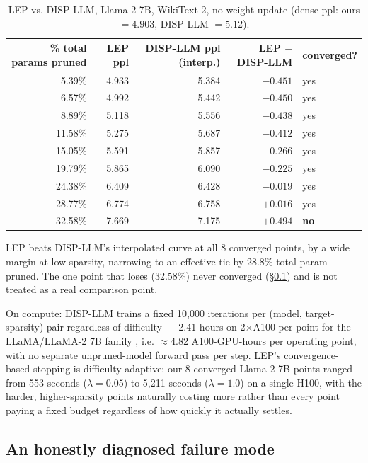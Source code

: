 \documentclass[11pt]{article}
\begin{document}
\begin{table}[htbp]
\centering
\caption{LEP vs. DISP-LLM, Llama-2-7B, WikiText-2, no weight update (dense ppl: ours $=4.903$, DISP-LLM $=5.12$).}
\label{tab:disp-llm}
\begin{tabular}{@{}rrrrl@{}}
\toprule
\% total params pruned & LEP ppl & DISP-LLM ppl (interp.) & LEP $-$ DISP-LLM & converged? \\
\midrule
5.39\%  & 4.933 & 5.384 & \textbf{$-0.451$} & yes \\
6.57\%  & 4.992 & 5.442 & \textbf{$-0.450$} & yes \\
8.89\%  & 5.118 & 5.556 & \textbf{$-0.438$} & yes \\
11.58\% & 5.275 & 5.687 & \textbf{$-0.412$} & yes \\
15.05\% & 5.591 & 5.857 & \textbf{$-0.266$} & yes \\
19.79\% & 5.865 & 6.090 & \textbf{$-0.225$} & yes \\
24.38\% & 6.409 & 6.428 & \textbf{$-0.019$} & yes \\
28.77\% & 6.774 & 6.758 & $+0.016$ & yes \\
32.58\% & 7.669 & 7.175 & $+0.494$ & \textbf{no} \\
\bottomrule
\end{tabular}
\end{table}

LEP beats DISP-LLM's interpolated curve at all 8 converged points, by a wide
margin at low sparsity, narrowing to an effective tie by 28.8\% total-param
pruned. The one point that loses (32.58\%) never converged (\S\ref{sec:failure-mode}) and is not
treated as a real comparison point.

On compute: DISP-LLM trains a fixed 10,000 iterations per (model,
target-sparsity) pair regardless of difficulty --- 2.41 hours on 2$\times$A100
per point for the LLaMA/LLaMA-2 7B family \citep[Table 6]{gao2024displlm}, i.e.
$\approx$4.82 A100-GPU-hours per operating point, with no separate
unpruned-model forward pass per step. LEP's convergence-based stopping is
difficulty-adaptive: our 8 converged Llama-2-7B points ranged from 553
seconds ($\lambda=0.05$) to 5{,}211 seconds ($\lambda=1.0$) on a single H100,
with the harder, higher-sparsity points naturally costing more rather than
every point paying a fixed budget regardless of how quickly it actually
settles.

\subsection{An honestly diagnosed failure mode}
\label{sec:failure-mode}
\end{document}
